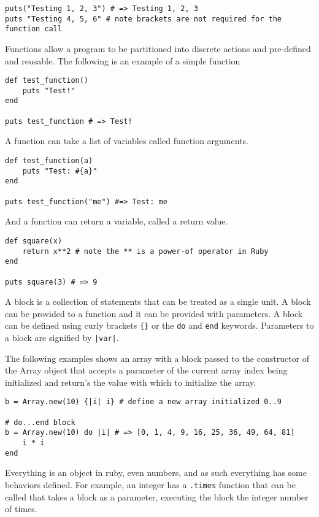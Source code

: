 \begin{bibunit}
\begin{lstlisting}
puts("Testing 1, 2, 3") # => Testing 1, 2, 3
puts "Testing 4, 5, 6" # note brackets are not required for the function call
\end{lstlisting}

Functions allow a program to be partitioned into discrete actions and pre-defined and reusable. The following is an example of a simple function

\begin{lstlisting}
def test_function()
	puts "Test!"
end

puts test_function # => Test!
\end{lstlisting}

A function can take a list of variables called function arguments.

\begin{lstlisting}
def test_function(a)
	puts "Test: #{a}"
end

puts test_function("me") #=> Test: me
\end{lstlisting}

And a function can return a variable, called a return value.

\begin{lstlisting}
def square(x)
	return x**2 # note the ** is a power-of operator in Ruby
end

puts square(3) # => 9
\end{lstlisting}

A block is a collection of statements that can be treated as a single unit. A block can be provided to a function and it can be provided with parameters. A block can be defined using curly brackets \texttt{\{\}} or the \texttt{do} and \texttt{end} keywords. Parameters to a block are signified by \texttt{|var|}.

The following examples shows an array with a block passed to the constructor of the Array object that accepts a parameter of the current array index being initialized and return's the value with which to initialize the array.

\begin{lstlisting}
b = Array.new(10) {|i| i} # define a new array initialized 0..9

# do...end block
b = Array.new(10) do |i| # => [0, 1, 4, 9, 16, 25, 36, 49, 64, 81]
	i * i
end
\end{lstlisting}

Everything is an object in ruby, even numbers, and as such everything has some behaviors defined. For example, an integer has a \texttt{.times} function that can be called that takes a block as a parameter, executing the block the integer number of times.


\end{bibunit}
